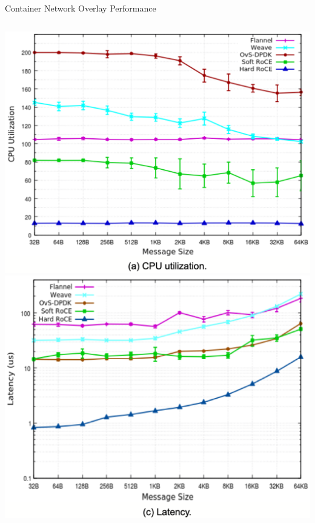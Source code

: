 \documentclass{beamer}
\begin{document}
\begin{frame}{Container Network Overlay Performance}
    \begin{columns}
        \includegraphics[width=\textwidth]{overlayperf/cpuutil.png}
        \includegraphics[width=\textwidth]{overlayperf/latency.png}

\end{columns}
\end{frame}
\end{document}
